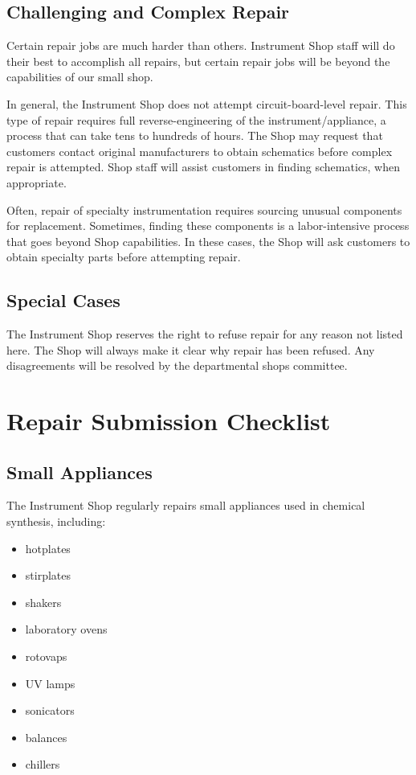 \documentclass{training}
\begin{document}
\subsection{Challenging and Complex Repair}

Certain repair jobs are much harder than others.
Instrument Shop staff will do their best to accomplish all repairs, but certain repair jobs will be beyond the capabilities of our small shop.

In general, the Instrument Shop does not attempt circuit-board-level repair.
This type of repair requires full reverse-engineering of the instrument/appliance, a process that can take tens to hundreds of hours.
The Shop may request that customers contact original manufacturers to obtain schematics before complex repair is attempted.
Shop staff will assist customers in finding schematics, when appropriate.

Often, repair of specialty instrumentation requires sourcing unusual components for replacement. Sometimes, finding these components is a labor-intensive process that goes beyond Shop capabilities.
In these cases, the Shop will ask customers to obtain specialty parts before attempting repair.

\subsection{Special Cases}

The Instrument Shop reserves the right to refuse repair for any reason not listed here.
The Shop will always make it clear why repair has been refused.
Any disagreements will be resolved by the departmental shops committee.

\clearpage
\section{Repair Submission Checklist}

\subsection{Small Appliances}

The Instrument Shop regularly repairs small appliances used in chemical synthesis, including:

\begin{multicols}{3}
\begin{itemize}
  \item hotplates
  \item stirplates
  \item shakers
  \item laboratory ovens
  \item rotovaps
  \item UV lamps
  \item sonicators
  \item balances
  \item chillers
\end{itemize}
\end{multicols}
\end{document}
